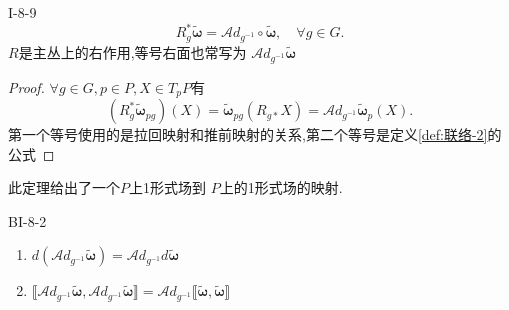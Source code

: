 \documentclass[../main.tex]{subfiles}
\begin{document}
\begin{theorem}
  {}{I-8-9}
  \[
 R^*_g \bm{\tilde{\omega}} = \mathscr{A}\!d_{g^{-1}}\circ \bm{\tilde{\omega}}, \quad \forall g\in G 
  .\] 
  $R$是主丛上的右作用,等号右面也常写为 $\mathscr{A}\!d_{g^{-1}}\bm{\tilde{\omega}}$
\end{theorem}
\begin{proof}
  $\forall g \in G, p \in  P,X \in T_pP$有\[
    (R^*_g \bm{\tilde{\omega}}_{pg})(X)  = \bm{\tilde{\omega}}_{pg} (R_{g*}X) = \mathscr{A}\!d_{g^{-1}} \bm{\tilde{\omega}}_{p}(X)
  .\] 
  第一个等号使用的是拉回映射和推前映射的关系,第二个等号是定义\ref{def:联络-2}的公式
\end{proof}
此定理给出了一个$P$上1形式场到 $P$上的1形式场的映射.
\begin{theorem}
  {}{BI-8-2}
   \begin{enumerate}
     \item $d (\mathscr{A}\!d_{g^{-1}}  \bm{\tilde{\omega}}) = \mathscr{A}\!d_{g^{-1}} d  \bm{\tilde{\omega}}$ 
     \item $\llbracket \mathscr{A}\!d_{g^{-1}}  \bm{\tilde{\omega}},\mathscr{A}\!d_{g^{-1}}  \bm{\tilde{\omega}} \rrbracket = \mathscr{A}\!d_{g^{-1}}\llbracket \tilde{\bm{\omega} },\tilde{\bm{\omega} } \rrbracket $
   \end{enumerate}
\end{theorem}
\end{document}
